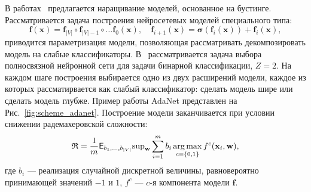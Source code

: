 В работах~\cite{boost_res,adanet} предлагается наращивание моделей, основанное на бустинге. Рассматривается задача построения нейросетевых моделей специального типа:
\[
    \mathbf{f}(\mathbf{x}) = \mathbf{f}_{|V|} \circ \mathbf{f}_{|V|-1} \circ \dots \mathbf{f}_0(\mathbf{x}), \quad  \mathbf{f}_{i+1}(\mathbf{x}) = \boldsymbol{\sigma}\left(\mathbf{f}_i(\mathbf{x})\right) + \mathbf{f}_i(\mathbf{x}),
\]
приводится параметризация модели, позволяющая рассматривать декомпозировать модель на слабые классификаторы.
В~\cite{adanet} рассматривается задача выбора полносвязной нейронной сети для задачи бинарной классификации, $Z=2$. На каждом шаге построения выбирается одно из двух расширений модели, каждое из которых рассматирвается как слабый классификатор: сделать модель шире или сделать модель глубже. Пример работы AdaNet представлен на Рис.~\ref{fig:scheme_adanet}.
Построение модели заканчивается при условии снижении радемахеровской сложности:
\begin{equation}
\label{eq:rad}
    \mathfrak{R} = \frac{1}{m}\mathsf{E}_{{b}_1,\dots, {b}_{|V|}} \text{sup}_{\mathbf{w}} \sum_{i=1}^m {b}_i \operatorname*{arg\,max}_{c = \{0,1\}}f^{c}(\mathbf{x}_i, \mathbf{w}),
\end{equation}
где ${b}_i$ --- реализация случайной дискретной величины, равновероятно принимающей значений $-1$ и $1$, $f^{c}$ --- $c$-я компонента модели $\mathbf{f}$.

